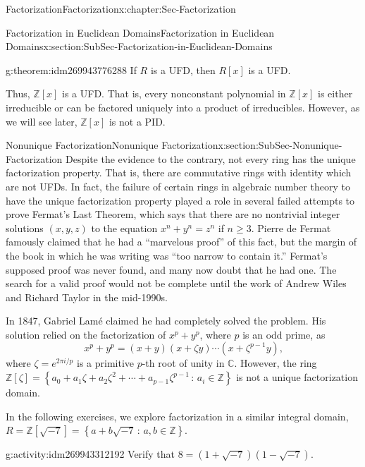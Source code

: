 \documentclass[oneside,10pt,]{book}
\numberwithin{equation}{section}
\renewcommand{\ge}{\geqslant}
\newcommand{\setof}[2]{{\left\{#1\,\colon\,#2\right\}}}
\def\C{{\mathbb C}}
\def\Z{{\mathbb Z}}
\begin{document}
\begin{chapterptx}{Factorization}{}{Factorization}{}{}{x:chapter:Sec-Factorization}
\begin{sectionptx}{Factorization in Euclidean Domains}{}{Factorization in Euclidean Domains}{}{}{x:section:SubSec-Factorization-in-Euclidean-Domains}
\begin{theorem}{}{}{g:theorem:idm269943776288}%
If \(R\) is a UFD, then \(R[x]\) is a UFD.%
\end{theorem}
Thus, \(\Z[x]\) is a UFD. That is, every nonconstant polynomial in \(\Z[x]\) is either irreducible or can be factored uniquely into a product of irreducibles.  However, as we will see later, \(\Z[x]\) is not a PID.%
\end{sectionptx}
%
%
\typeout{************************************************}
\typeout{************************************************}
%
\begin{sectionptx}{Nonunique Factorization}{}{Nonunique Factorization}{}{}{x:section:SubSec-Nonunique-Factorization}
Despite the evidence to the contrary, not every ring has the unique factorization property. That is, there are commutative rings with identity which are not UFDs.  In fact, the failure of certain rings in algebraic number theory to have the unique factorization property played a role in several failed attempts to prove Fermat's Last Theorem, which says that there are no nontrivial integer solutions \((x,y,z)\) to the equation \(x^n + y^n = z^n\) if \(n \ge 3\). Pierre de Fermat famously claimed that he had a ``marvelous proof'' of this fact, but the margin of the book in which he was writing was ``too narrow to contain it.'' Fermat's supposed proof was never found, and many now doubt that he had one. The search for a valid proof would not be complete until the work of Andrew Wiles and Richard Taylor in the mid-1990s.%
\par
In 1847, Gabriel Lamé claimed he had completely solved the problem. His solution relied on the factorization of \(x^p + y^p\), where \(p\) is an odd prime, as%
\begin{equation*}
x^p + y^p = (x+y)(x+\zeta y) \cdots (x+\zeta^{p-1}y)\text{,}
\end{equation*}
where \(\zeta = e^{2\pi i/p}\) is a primitive \(p\)-th root of unity in \(\C\). However, the ring \(\Z[\zeta] = \setof{a_0 + a_1 \zeta + a_2 \zeta^2 + \cdots + a_{p-1} \zeta^{p-1}}{a_i\in\Z}\) is not a unique factorization domain.%
\par
In the following exercises, we explore factorization in a similar integral domain, \(R = \Z[\sqrt{-7}] = \setof{a+b\sqrt{-7}}{a,b\in\Z}\).%
\begin{activity}{}{g:activity:idm269943312192}%
Verify that \(8 = (1+\sqrt{-7})(1-\sqrt{-7})\).%
\end{activity}

\end{sectionptx}
\end{chapterptx}
\end{document}
